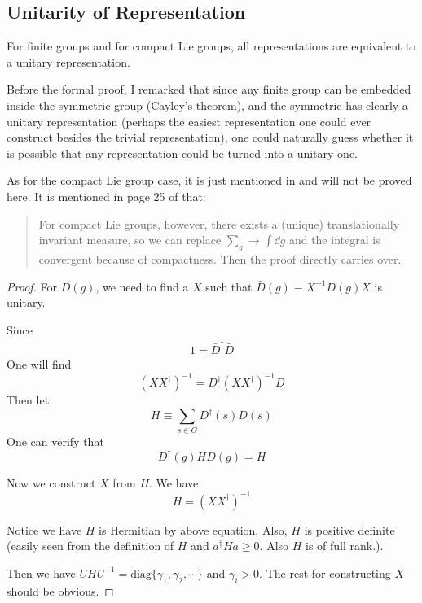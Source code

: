 

\subsection{Unitarity of Representation}
\label{sec:Unitarity-of-Representation}

\begin{thm}
    For finite groups and for compact Lie groups, all representations
    are equivalent to a unitary representation.
\end{thm}
\begin{remark}
    Before the formal proof, I remarked that since any finite group
    can be embedded inside the symmetric group (Cayley's theorem), and
    the symmetric has clearly a unitary representation (perhaps the
    easiest representation one could ever construct besides the
    trivial representation), one could naturally guess whether it is
    possible that any representation could be turned into a unitary
    one.

    As for the compact Lie group case, it is just mentioned in
    \cite{Ludeling} and will not be proved here. It is mentioned in
    page 25 of \cite{Ludeling} that:
    \begin{quote}
        For compact Lie groups, however, there exists a (unique)
        translationally invariant measure, so we can replace
        $\sum_g\to \int \dd g$ and the integral is convergent because
        of compactness. Then the proof directly carries over.
    \end{quote}
\end{remark}
\begin{proof}
    For $D(g)$, we need to find a $X$ such that $\bar{D}(g)\equiv
    X^{-1}D(g)X$ is unitary.

    Since
    \begin{align*}
        1 = \bar{D}^\dagger \bar{D}
    \end{align*}
    One will find 
    $$ (XX^\dagger)^{-1} = D^\dagger (XX^\dagger)^{-1} D$$
    Then let
    \begin{equation}
        H\equiv \sum_{s\in G} D^\dagger(s) D(s)
    \end{equation}
    One can verify that
    \begin{equation}
        D^\dagger (g) H D(g) = H
    \end{equation}

    Now we construct $X$ from $H$. We have
    \begin{equation}
        H = (XX^\dagger)^{-1}
    \end{equation}

    Notice we have $H$ is Hermitian by above equation. Also, $H$ is
    positive definite (easily seen from the definition of $H$ and 
    $a^\dagger H a \geq 0$. Also $H$ is of full rank.).

    Then we have $UHU^{-1} = \mathrm{diag}\{\gamma_1,\gamma_2,\cdots\}$
    and $\gamma_i > 0$. The rest for constructing $X$ should be
    obvious.
\end{proof}
